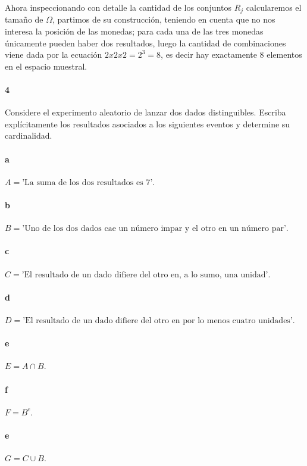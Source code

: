 \documentclass{article}
\begin{document}
Ahora inspeccionando con detalle la cantidad de los conjuntos $R_j$ calcularemos el tamaño de $\Omega$, partimos de su construcción, teniendo en cuenta que no nos interesa la posición de las monedas; para cada una de las tres monedas únicamente pueden haber dos resultados, luego la cantidad de combinaciones viene dada por la ecuación $2 x 2 x 2 = 2^3 = 8$, es decir hay exactamente $8$ elementos en el espacio muestral.

\paragraph{4} Considere el experimento aleatorio de lanzar dos dados distinguibles. Escriba explícitamente los resultados asociados a los siguientes eventos y determine su cardinalidad.
\paragraph{a} $A = \text{'La suma de los dos resultados es 7'}$.
\paragraph{b} $B = \text{'Uno de los dos dados cae un número impar y el otro en un número par'}$.
\paragraph{c} $C = \text{'El resultado de un dado difiere del otro en, a lo sumo, una unidad'}$.
\paragraph{d} $D = \text{'El resultado de un dado difiere del otro en por lo menos cuatro unidades'}$.
\paragraph{e} $E = A \cap B$.
\paragraph{f} $F = B^{c}$.
\paragraph{e} $G = C \cup B$.
\end{document}
